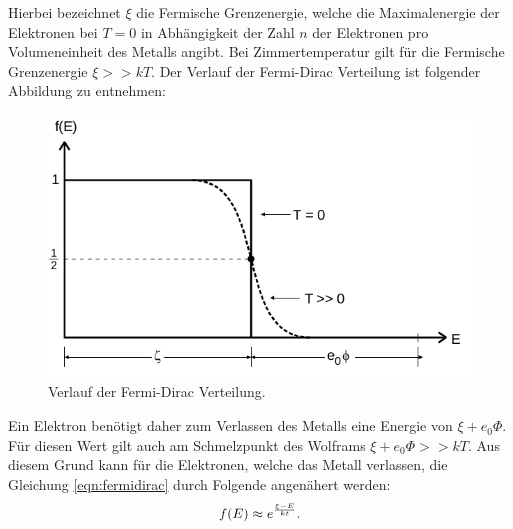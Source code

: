 \noindent
Hierbei bezeichnet $\xi$ die Fermische Grenzenergie, welche die Maximalenergie
der Elektronen bei $T = 0$ in Abhängigkeit der Zahl $n$ der Elektronen pro
Volumeneinheit des Metalls angibt. Bei Zimmertemperatur gilt für die Fermische
Grenzenergie $\xi >> kT$. Der Verlauf der Fermi-Dirac Verteilung ist folgender
Abbildung zu entnehmen:
\begin{figure}[H]
  \centering
  \includegraphics[scale=0.5]{content/fermidirac.png}
  \caption{Verlauf der Fermi-Dirac Verteilung. \cite{AP01}}
  \label{fig:fermidirac}
\end{figure}
\noindent
Ein Elektron benötigt daher zum Verlassen des Metalls eine Energie von
$\xi + e_0 \Phi$. Für diesen Wert gilt auch am Schmelzpunkt des Wolframs
$\xi + e_0 \Phi >> kT$. Aus diesem Grund kann für die Elektronen, welche
das Metall verlassen, die Gleichung \eqref{eqn:fermidirac} durch Folgende
angenähert werden:
\begin{equation}
  \centering
  f(E) \approx e^{\frac{\xi -E}{kt}}.
  \label{eqn:approxfermidirac}
\end{equation}
\noindent

